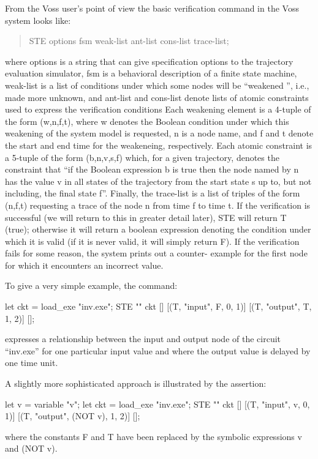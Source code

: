 From the Voss user's point of view the basic verification command
in the Voss system looks like:
\begin{quote}
STE options fsm weak-list ant-list cons-list trace-list;
\end{quote}
%
where options is a string that can give specification options to
the trajectory evaluation simulator, fsm%
%
{} is a behavioral description
of a finite state machine, weak-list is a list of conditions under which
some nodes will be ``weakened%
%
{}'', i.e., made more unknown, and ant-list
and cons-list denote lists of atomic constraints%
%
{} used to express the
verification conditions
Each weakening element is a 4-tuple of the form (w,n,f,t), where
w denotes the Boolean condition under which this weakening of the
system model is requested, n is a node name, and f and t denote
the start and end time for the weakeneing, respectively.
Each atomic constraint is a 5-tuple of the form (b,n,v,s,f) which,
for a given trajectory, denotes the constraint that ``if the Boolean
expression b is true then the node named by n has the value v in
all states of the trajectory from the start state s up to, but not
including, the final state f''. Finally, the trace-list is a list
of triples of the form (n,f,t) requesting a trace%
%
{} of the node n
from time f to time t. If the verification is successful (we will
return to this in greater detail later), STE will return T (true);
otherwise it will return a boolean expression denoting the condition
under which it is valid (if it is never valid, it will simply return
F). If the verification fails for some reason, the system prints
out a counter- example for the first node for which it encounters
an incorrect value.

To give a very simple example, the command:
\begin{hol}
let ckt = load_exe "inv.exe";
STE "" ckt [] [(T, "input", F, 0, 1)] [(T, "output", T, 1, 2)] [];
\end{hol}
expresses a relationship between the input and output node of the
circuit ``inv.exe'' for one particular input value and where the
output value is delayed by one time unit.

A slightly more sophisticated approach is illustrated by the assertion:
\begin{hol}
let v = variable "v";
let ckt = load_exe "inv.exe";
STE "" ckt [] [(T, "input", v, 0, 1)] [(T, "output", (NOT v), 1, 2)] [];
\end{hol}
where the constants F and T have been replaced by the symbolic
expressions v and (NOT v).

